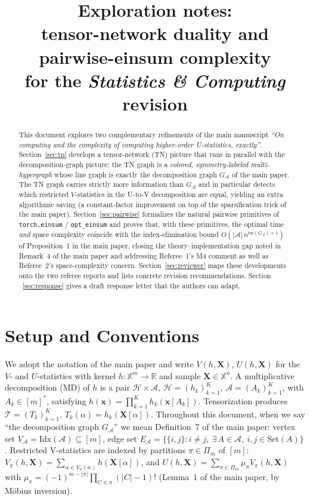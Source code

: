 \documentclass[11pt]{article}
\title{Exploration notes:\\ tensor-network duality and pairwise-einsum complexity\\
       for the \emph{Statistics \& Computing} revision}
\author{}
\date{}
\newcommand{\bbR}{\mathbb{R}}
\newcommand{\bbX}{\mathbb{X}}
\newcommand{\calA}{\mathcal{A}}
\newcommand{\calH}{\mathcal{H}}
\newcommand{\calT}{\mathcal{T}}
\newcommand{\bX}{\bm{X}}
\newcommand{\tw}{\mathrm{tw}}
\newcommand{\takesetp}[1]{\mathrm{Set}(#1)}
\newcommand{\indexset}{\mathrm{Idx}}
\theoremstyle{plain}
\theoremstyle{definition}
\begin{document}
\maketitle

\begin{abstract}
This document explores two complementary refinements of the main manuscript
\emph{``On computing and the complexity of computing higher-order U-statistics,
exactly''}.  Section~\ref{sec:tn} develops a tensor-network (TN) picture
that runs in parallel with the decomposition-graph picture: the TN graph is a
\emph{colored, symmetry-labeled multi-hypergraph} whose line graph is exactly
the decomposition graph $G_\calA$ of the main paper.  The TN graph carries
strictly more information than $G_\calA$ and in particular detects which
restricted $V$-statistics in the U-to-V decomposition are equal, yielding an
extra algorithmic saving (a constant-factor improvement on top of the
sparsification trick of the main paper).  Section~\ref{sec:pairwise} formalizes
the natural pairwise primitives of \texttt{torch.einsum} / \texttt{opt\_einsum}
and proves that, with these primitives, the optimal time \emph{and} space
complexity coincide with the index-elimination bound
$O(|\calA|\,n^{\tw(G_\calA)+1})$ of Proposition~1 in the main paper, closing
the theory--implementation gap noted in Remark~4 of the main paper and
addressing Referee~1's M4 comment as well as Referee~2's space-complexity
concern.  Section~\ref{sec:reviewer} maps these developments onto the two
referee reports and lists concrete revision recommendations.  Section
~\ref{sec:response} gives a draft response letter that the authors can adapt.
\end{abstract}

\tableofcontents

\section{Setup and Conventions}

We adopt the notation of the main paper and write $V(h,\bX)$, $U(h,\bX)$ for
the $V$- and $U$-statistics with kernel $h:\bbX^m\to\bbR$ and sample
$\bX\in\bbX^n$.  A multiplicative decomposition (MD) of $h$ is a pair
$\calH\times\calA$, $\calH=(h_k)_{k=1}^K$, $\calA=(A_k)_{k=1}^K$, with
$A_k\in[m]^*$, satisfying
\(
   h(\bm{x}) = \prod_{k=1}^K h_k(\bm{x}[A_k]).
\)
Tensorization produces $\calT=(T_k)_{k=1}^K$, $T_k(\alpha)=h_k(\bX[\alpha])$.
Throughout this document, when we say ``the decomposition graph $G_\calA$''
we mean Definition~7 of the main paper: vertex set $V_\calA=\indexset(\calA)\subseteq[m]$,
edge set $E_\calA=\{\{i,j\}: i\neq j,\ \exists\,A\in\calA, \ i,j\in\takesetp{A}\}$.
Restricted V-statistics are indexed by partitions $\pi\in\Pi_m$ of $[m]$:
$V_\pi(h,\bX) = \sum_{\alpha\in V_\pi(n)} h(\bX[\alpha])$, and
$U(h,\bX) = \sum_{\pi\in\Pi_m} \mu_\pi V_\pi(h,\bX)$ with
$\mu_\pi=(-1)^{m-|\pi|}\prod_{C\in\pi}(|C|-1)!$
(Lemma~1 of the main paper, by M\"obius inversion).
\end{document}

